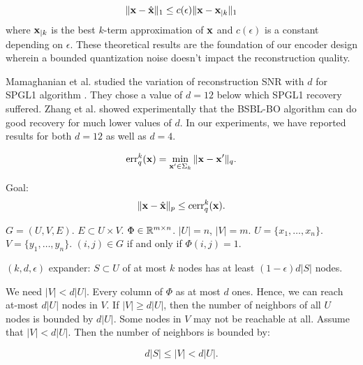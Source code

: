 \documentclass[journal, a4paper, onecolumn, draftcls]{IEEEtran} %
\begin{document}
$$
\| \mathbf{x} - \hat{\mathbf{x}} \|_1 \leq c(\epsilon) \| \mathbf{x} - \mathbf{x}_{|k} \|_1
$$
where $\mathbf{x}_{|k}$ is the best $k$-term approximation of $\mathbf{x}$
and $c(\epsilon)$ is a constant depending on $\epsilon$.
These theoretical results are the foundation of our encoder
design wherein a bounded quantization noise doesn't impact
the reconstruction quality. 

Mamaghanian et al. \cite{mamaghanian2011compressed}
studied the variation of reconstruction SNR with $d$ for SPGL1
algorithm \cite{van2009probing}.
They chose a value of $d=12$ below which
SPGL1 recovery suffered. Zhang et al. \cite{zhang2012compressed}
showed experimentally that the BSBL-BO algorithm can do good
recovery for much lower values of $d$.
In our experiments, we have reported results for both $d=12$
as well as $d=4$.



$$
\mathrm{err}_q^k(\mathbf{x}) = \min_{\mathbf{x}' \in \Sigma_k} \| \mathbf{x} - \mathbf{x}' \|_q.
$$

Goal:
$$
\| \mathbf{x} - \hat{\mathbf{x}} \|_p \leq c \mathrm{err}_q^k(\mathbf{x}).
$$


$G = (U, V, E)$. $E \subset U \times V$.
$\Phi \in \mathbb{R}^{m \times n}$. $|U| = n$, $|V| = m$.
$U = \{ x_1, \dots, x_n \}$.
$V = \{y_1, \dots, y_n \}$.
$(i, j) \in G$ if and only if $\Phi(i, j) = 1$.


$(k, d, \epsilon)$ expander: $S \subset U$ of at most $k$
nodes has at least $(1 - \epsilon)d |S|$ nodes. 

We need $|V| < d |U|$. Every column of $\Phi$
as at most $d$ ones. Hence, we can reach at-most
$d |U|$ nodes in $V$. If $|V| \geq d |U|$, 
then the number of neighbors of all $U$ nodes
is bounded by $d |U|$. Some nodes in $V$ may
not be reachable at all.
Assume that $|V| < d |U|$. Then the number of
neighbors is bounded by:

$$
d | S | \leq | V|  < d |U|.
$$






\end{document}
